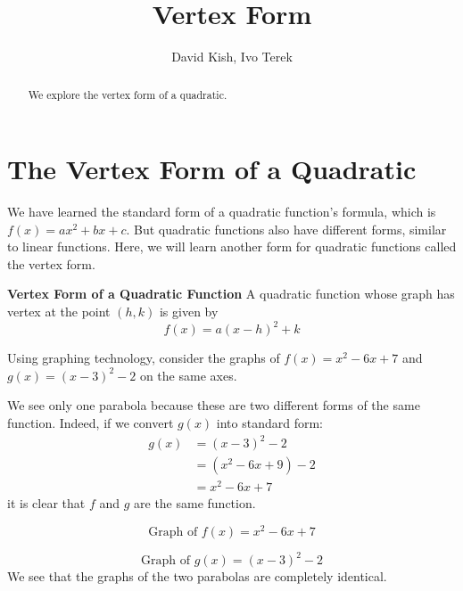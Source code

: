 \documentclass{ximera}
\author{David Kish, Ivo Terek}
\title{Vertex Form}
\begin{document}
\licenseY
\begin{abstract}
We explore the vertex form of a quadratic.
\end{abstract}
\maketitle


\section{The Vertex Form of a Quadratic}

      We have learned the standard form of a quadratic function's formula, which is $f(x)=ax^2+bx+c$.
      But quadratic functions also have different forms, similar to linear functions. Here, we will learn another form for quadratic functions called the vertex form.
\begin{callout} \textbf{\large{Vertex Form of a Quadratic Function}}
          A quadratic function whose graph has vertex at the point $(h,k)$ is given by
$$
f(x)=a(x-h)^2+k
$$
\end{callout}
    Using graphing technology, consider the graphs of $f(x)=x^2-6x+7$ and $g(x)=(x-3)^2-2$ on the same axes.

    We see only one parabola because these are two different forms of the same function.
    Indeed, if we convert $g(x)$ into standard form:
	\begin{align*}
		g(x)&=(x-3)^2-2\\
			&=(x^2-6x+9)-2\\
			&=x^2-6x+7
	\end{align*}
    it is clear that $f$ and $g$ are the same function.
 

    
    \begin{image}
    \end{image}
    $$ \text{Graph of } f(x)=x^2-6x+7 
    $$ 
    \begin{image}
    \end{image}
    $$\text{Graph of } g(x)=(x-3)^2-2 $$
    We see that the graphs of the two parabolas are completely identical.
\end{document}
